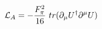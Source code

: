 \begin{equation}
{\cal{L}}_A= -\frac{F_\pi^2}{16}~tr(\partial_\mu U^\dag \partial^\mu U)
\end{equation}

